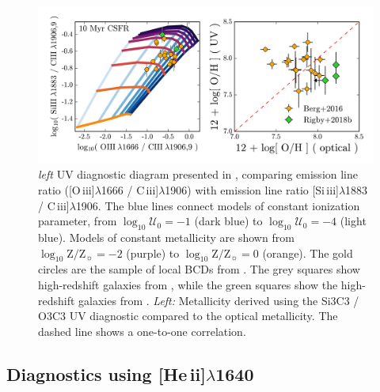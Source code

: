 \documentclass[preprint2]{aastex62}
\newcommand{\oiii}{[O\,{\sc iii}]\xspace}
\newcommand{\heii}{[He\,{\sc ii}]\xspace}
\newcommand{\SiuIII}{[Si\,{\sc iii}]\xspace}
\newcommand{\ciii}{C\,{\sc iii}]\xspace}
\newcommand{\logten}{\ensuremath{\log_{10}}}
\newcommand{\logZeq}[1]{\ensuremath{\logten \mathrm{Z}/\mathrm{Z}_{\sun} = #1}}
\newcommand{\logUeq}[1]{\ensuremath{\logten \mathcal{U}_0 = #1}}
\begin{document}
\begin{figure}
  \begin{center}
    \includegraphics[width=\linewidth]{figs/f3.png}
    \caption{\emph{left} UV diagnostic diagram presented in \citet{Byler+2018}, comparing emission line ratio (\oiii$\lambda$1666 / \ciii$\lambda$1906) with emission line ratio \SiuIII$\lambda$1883 / \ciii$\lambda$1906. The blue lines connect models of constant ionization parameter, from \logUeq{-1} (dark blue) to \logUeq{-4} (light blue). Models of constant metallicity are shown from \logZeq{-2} (purple) to \logZeq{0} (orange).  The gold circles are the sample of local BCDs from \citet{Berg+2016}. The grey squares show high-redshift galaxies from \citet{Stark+2014}, while the green squares show the high-redshift galaxies from \citet{Rigby+2018b}. \emph{Left:} Metallicity derived using the Si3C3 / O3C3 UV diagnostic compared to the optical metallicity. The dashed line shows a one-to-one correlation.}
    \label{fig:UVC}
  \end{center}
\end{figure}

\subsection{Diagnostics using \heii$\lambda$1640}\label{sec:UVOpt:He}
\end{document}
